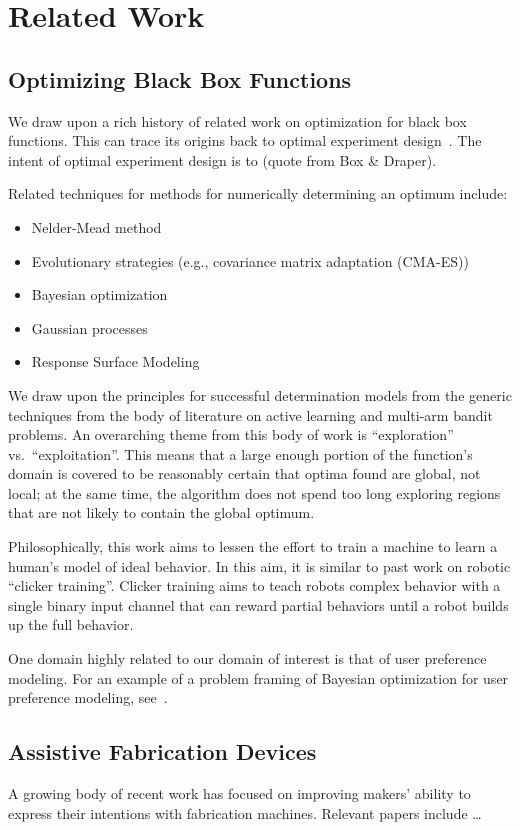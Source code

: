 \section{Related Work}

\subsection{Optimizing Black Box Functions}

We draw upon a rich history of related work on optimization for black box functions.
This can trace its origins back to optimal experiment design~\cite{box}.
The intent of optimal experiment design is to (quote from Box \& Draper).

Related techniques for methods for numerically determining an optimum include:
\begin{itemize}
  \item Nelder-Mead method
  \item Evolutionary strategies (e.g., covariance matrix adaptation (CMA-ES))
  \item Bayesian optimization
  \item Gaussian processes
  \item Response Surface Modeling
\end{itemize}

We draw upon the principles for successful determination models from the generic techniques from the body of literature on active learning and multi-arm bandit problems.
An overarching theme from this body of work is ``exploration'' vs.\ ``exploitation''.
This means that a large enough portion of the function's domain is covered to be reasonably certain that optima found are global, not local;
at the same time, the algorithm does not spend too long exploring regions that are not likely to contain the global optimum.

Philosophically, this work aims to lessen the effort to train a machine to learn a human's model of ideal behavior.
In this aim, it is similar to past work on robotic ``clicker training''.
Clicker training aims to teach robots complex behavior with a single binary input channel that can reward partial behaviors until a robot builds up the full behavior.

One domain highly related to our domain of interest is that of user preference modeling.
For an example of a problem framing of Bayesian optimization for user preference modeling, see~\cite{brochu_tutorial_2010}.

\subsection{Assistive Fabrication Devices}

A growing body of recent work has focused on improving makers' ability to express their intentions with fabrication machines.
Relevant papers include \ldots

